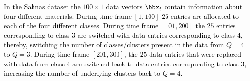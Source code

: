 \documentclass[10pt,final]{IEEEtran}
\begin{document}
\textcolor{black}{{In the Salinas dataset the $100\times 1$ data vectors $\bbx_t$ contain information about four different materials. During time frame $[1,100]$ $25$ entries are allocated to each of the four different classes. During time frame  $[101,200]$ the $25$ entries corresponding to class 3 are switched  with data entries corresponding to class 4, thereby, switching the number of classes/clusters present in the data from $Q=4$ to $Q=3$. During time frame $[201,300]$, the $25$ data entries that were replaced with data from class $4$ are switched back to data entries corresponding to class $3$, increasing the number of underlying clusters back to $Q=4$.}}
\end{document}
